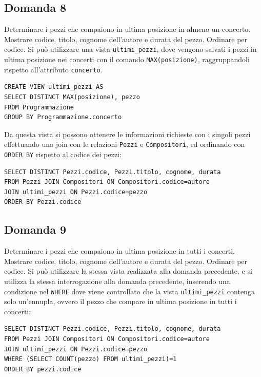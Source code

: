 \documentclass{article}
\numberwithin{equation}{subsection}
\begin{document}
\subsection{Domanda 8}
Determinare i pezzi che compaiono in ultima posizione in almeno un concerto. Mostrare codice, titolo, cognome dell'autore e durata del pezzo. Ordinare per codice. Si può utilizzare una vista \verb|ultimi_pezzi|, 
dove vengono salvati i pezzi in ultima posizione nei concerti con il comando \verb|MAX(posizione)|, raggruppandoli rispetto all'attributo \verb|concerto|. 
\begin{verbatim}
CREATE VIEW ultimi_pezzi AS
SELECT DISTINCT MAX(posizione), pezzo
FROM Programmazione 
GROUP BY Programmazione.concerto
\end{verbatim}
Da questa vista si possono ottenere le informazioni richieste con i singoli pezzi effettuando una join con le relazioni \verb|Pezzi| e \verb|Compositori|, ed ordinando con \verb|ORDER BY| rispetto al codice dei 
pezzi:
\begin{verbatim}
SELECT DISTINCT Pezzi.codice, Pezzi.titolo, cognome, durata
FROM Pezzi JOIN Compositori ON Compositori.codice=autore
JOIN ultimi_pezzi ON Pezzi.codice=pezzo
ORDER BY Pezzi.codice
\end{verbatim}

\subsection{Domanda 9}
Determinare i pezzi che compaiono in ultima posizione in tutti i concerti. Mostrare codice, titolo, cognome dell'autore e durata del pezzo. Ordinare per codice. Si può utilizzare la stessa vista realizzata 
alla domanda precedente, e si utilizza la stessa interrogazione alla domanda precedente, inserendo una condizione nel \verb|WHERE| dove viene controllato che la vista \verb|ultimi_pezzi| contenga solo un'ennupla, 
ovvero il pezzo che compare in ultima posizione in tutti i concerti:
\begin{verbatim}
SELECT DISTINCT Pezzi.codice, Pezzi.titolo, cognome, durata
FROM Pezzi JOIN Compositori ON Compositori.codice=autore
JOIN ultimi_pezzi ON Pezzi.codice=pezzo
WHERE (SELECT COUNT(pezzo) FROM ultimi_pezzi)=1
ORDER BY pezzi.codice
\end{verbatim}
\end{document}
